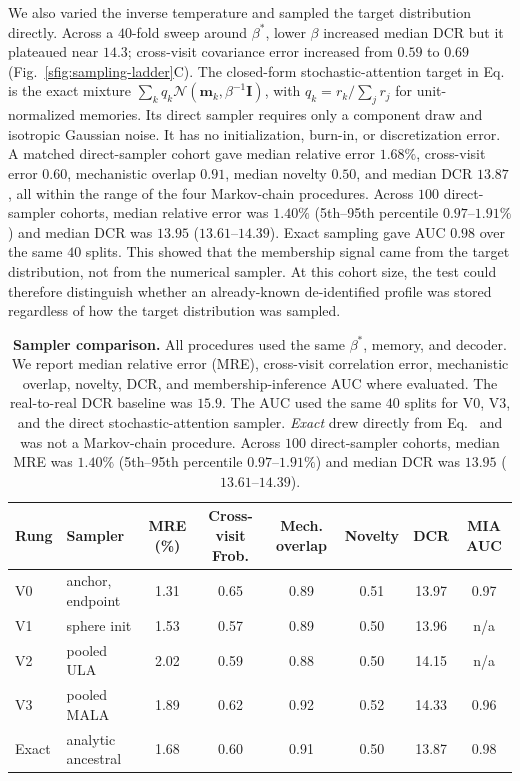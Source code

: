 We also varied the inverse temperature and sampled the target distribution directly.
Across a $40$-fold sweep around $\beta^*$, lower $\beta$ increased median DCR but it plateaued
near $14.3$; cross-visit covariance error increased from $0.59$ to $0.69$
(Fig.~\ref{sfig:sampling-ladder}C). The closed-form stochastic-attention target in
Eq.~ is the exact mixture
$\sum_k q_k\mathcal{N}(\mathbf{m}_k,\beta^{-1}\mathbf{I})$, with
$q_k=r_k/\sum_j r_j$ for unit-normalized memories. Its direct sampler requires only a component
draw and isotropic Gaussian noise. It has no initialization, burn-in, or discretization error.
A matched direct-sampler cohort gave median relative error $1.68\%$, cross-visit error $0.60$,
mechanistic overlap $0.91$, median novelty $0.50$, and median DCR $13.87$, all within the range
of the four Markov-chain procedures. Across $100$ direct-sampler cohorts, median relative error was
$1.40\%$ (5th--95th percentile $0.97$--$1.91\%$) and median DCR was $13.95$
($13.61$--$14.39$). Exact sampling gave AUC $0.98$ over the same $40$ splits. This showed that
the membership signal came from the target distribution, not from the numerical sampler. At
this cohort size, the test could therefore distinguish whether an already-known de-identified
profile was stored regardless of how the target distribution was sampled.

\begin{table}[ht]
\centering
\small
\caption{\textbf{Sampler comparison.} All procedures used the same $\beta^*$, memory,
and decoder. We report median relative error (MRE), cross-visit correlation error,
mechanistic overlap, novelty, DCR, and membership-inference AUC where evaluated. The
real-to-real DCR baseline was $15.9$. The AUC used the same $40$ splits for V0, V3, and the
direct stochastic-attention sampler. \emph{Exact} drew directly from
Eq.~ and was not a
Markov-chain procedure. Across $100$ direct-sampler cohorts, median MRE was $1.40\%$ (5th--95th
percentile $0.97$--$1.91\%$) and median DCR was $13.95$ ($13.61$--$14.39$).}
\label{stab:sampling-ladder}
{\small
\setlength{\tabcolsep}{4pt}
\begin{tabular}{llcccccc}
\hline
Rung & Sampler & MRE (\%) & Cross-visit Frob. & Mech. overlap & Novelty & DCR & MIA AUC \\
\hline
V0 & anchor, endpoint & 1.31 & 0.65 & 0.89 & 0.51 & 13.97 & 0.97 \\
V1 & sphere init      & 1.53 & 0.57 & 0.89 & 0.50 & 13.96 & n/a  \\
V2 & pooled ULA       & 2.02 & 0.59 & 0.88 & 0.50 & 14.15 & n/a  \\
V3 & pooled MALA      & 1.89 & 0.62 & 0.92 & 0.52 & 14.33 & 0.96 \\
\hline
Exact & analytic ancestral & 1.68 & 0.60 & 0.91 & 0.50 & 13.87 & 0.98 \\
\hline
\end{tabular}
}
\end{table}

